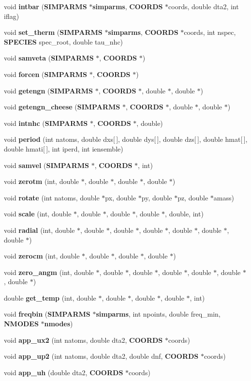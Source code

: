 \begin{CompactItemize}
\item 
void {\bf intbar} ({\bf SIMPARMS} $\ast${\bf simparms}, {\bf COORDS} $\ast$coords, double dta2, int iflag)
\item 
void {\bf set\_\-therm} ({\bf SIMPARMS} $\ast${\bf simparms}, {\bf COORDS} $\ast$coords, int nspec, {\bf SPECIES} spec\_\-root, double tau\_\-nhc)
\item 
void {\bf samveta} ({\bf SIMPARMS} $\ast$, {\bf COORDS} $\ast$)
\item 
void {\bf forcen} ({\bf SIMPARMS} $\ast$, {\bf COORDS} $\ast$)
\item 
void {\bf getengn} ({\bf SIMPARMS} $\ast$, {\bf COORDS} $\ast$, double $\ast$, double $\ast$)
\item 
void {\bf getengn\_\-cheese} ({\bf SIMPARMS} $\ast$, {\bf COORDS} $\ast$, double $\ast$, double $\ast$)
\item 
void {\bf intnhc} ({\bf SIMPARMS} $\ast$, {\bf COORDS} $\ast$, double)
\item 
void {\bf period} (int natoms, double dxs[$\,$], double dys[$\,$], double dzs[$\,$], double hmat[$\,$], double hmati[$\,$], int iperd, int iensemble)
\item 
void {\bf samvel} ({\bf SIMPARMS} $\ast$, {\bf COORDS} $\ast$, int)
\item 
void {\bf zerotm} (int, double $\ast$, double $\ast$, double $\ast$, double $\ast$)
\item 
void {\bf rotate} (int natoms, double $\ast$px, double $\ast$py, double $\ast$pz, double $\ast$amass)
\item 
void {\bf scale} (int, double $\ast$, double $\ast$, double $\ast$, double $\ast$, double, int)
\item 
void {\bf radial} (int, double $\ast$, double $\ast$, double $\ast$, double $\ast$, double $\ast$, double $\ast$, double $\ast$)
\item 
void {\bf zerocm} (int, double $\ast$, double $\ast$, double $\ast$, double $\ast$)
\item 
void {\bf zero\_\-angm} (int, double $\ast$, double $\ast$, double $\ast$, double $\ast$, double $\ast$, double $\ast$, double $\ast$)
\item 
double {\bf get\_\-temp} (int, double $\ast$, double $\ast$, double $\ast$, double $\ast$, int)
\item 
void {\bf freqbin} ({\bf SIMPARMS} $\ast${\bf simparms}, int npoints, double freq\_\-min, {\bf NMODES} $\ast${\bf nmodes})
\item 
void {\bf app\_\-ux2} (int natoms, double dta2, {\bf COORDS} $\ast$coords)
\item 
void {\bf app\_\-up2} (int natoms, double dta2, double dnf, {\bf COORDS} $\ast$coords)
\item 
void {\bf app\_\-uh} (double dta2, {\bf COORDS} $\ast$coords)
\end{CompactItemize}


